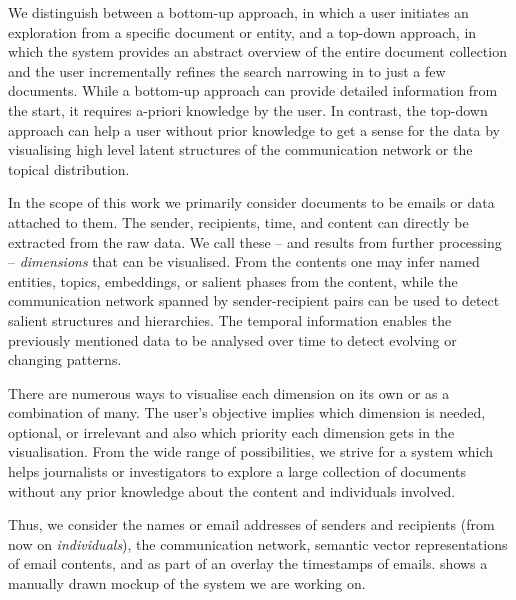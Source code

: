 We distinguish between a bottom-up approach, in which a user initiates an exploration from a specific document or entity, and a top-down approach, in which the system provides an abstract overview of the entire document collection and the user incrementally refines the search narrowing in to just a few documents.
While a bottom-up approach can provide detailed information from the start, it requires a-priori knowledge by the user.
In contrast, the top-down approach can help a user without prior knowledge to get a sense for the data by visualising high level latent structures of the communication network or the topical distribution.

In the scope of this work we primarily consider documents to be emails or data attached to them.
The sender, recipients, time, and content can directly be extracted from the raw data.
We call these -- and results from further processing -- \textit{dimensions} that can be visualised.
From the contents one may infer named entities, topics, embeddings, or salient phases from the content, while the communication network spanned by sender-recipient pairs can be used to detect salient structures and hierarchies.
The temporal information enables the previously mentioned data to be analysed over time to detect evolving or changing patterns.

There are numerous ways to visualise each dimension on its own or as a combination of many.
The user's objective implies which dimension is needed, optional, or irrelevant and also which priority each dimension gets in the visualisation.
From the wide range of possibilities, we strive for a system which helps journalists or investigators to explore a large collection of documents without any prior knowledge about the content and individuals involved.

Thus, we consider the names or email addresses of senders and recipients (from now on \textit{individuals}), the communication network, semantic vector representations of email contents, and as part of an overlay the timestamps of emails.
 shows a manually drawn mockup of the system we are working on.


